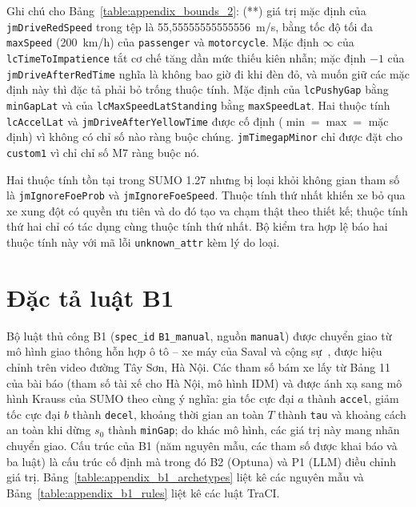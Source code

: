 \documentclass[../DoAn.tex]{subfiles}
\begin{document}
\begin{sloppypar}
Ghi chú cho Bảng~\ref{table:appendix_bounds_2}: (**) giá trị mặc định của \texttt{jmDriveRedSpeed} trong tệp là 55,55555555555556~m/s, bằng tốc độ tối đa \texttt{maxSpeed} (200~km/h) của \texttt{passenger} và \texttt{motorcycle}. Mặc định $\infty$ của \texttt{lcTimeToImpatience} tắt cơ chế tăng dần mức thiếu kiên nhẫn; mặc định $-1$ của \texttt{jmDriveAfterRedTime} nghĩa là không bao giờ đi khi đèn đỏ, và muốn giữ các mặc định này thì đặc tả phải bỏ trống thuộc tính. Mặc định của \texttt{lcPushyGap} bằng \texttt{minGapLat} và của \texttt{lcMaxSpeedLatStanding} bằng \texttt{maxSpeedLat}. Hai thuộc tính \texttt{lcAccelLat} và \texttt{jmDriveAfterYellowTime} được cố định ($\min = \max =$ mặc định) vì không có chỉ số nào ràng buộc chúng. \texttt{jmTimegapMinor} chỉ được đặt cho \texttt{custom1} vì chỉ chỉ số M7 ràng buộc nó.
\end{sloppypar}

Hai thuộc tính tồn tại trong SUMO 1.27 nhưng bị loại khỏi không gian tham số là \texttt{jmIgnoreFoeProb} và \texttt{jmIgnoreFoeSpeed}. Thuộc tính thứ nhất khiến xe bỏ qua xe xung đột có quyền ưu tiên và do đó tạo va chạm thật theo thiết kế; thuộc tính thứ hai chỉ có tác dụng cùng thuộc tính thứ nhất. Bộ kiểm tra hợp lệ báo hai thuộc tính này với mã lỗi \texttt{unknown\_attr} kèm lý do loại.

\section{Đặc tả luật B1}
\label{section:appendix_b1}

Bộ luật thủ công B1 (\texttt{spec\_id} \texttt{B1\_manual}, nguồn \texttt{manual}) được chuyển giao từ mô hình giao thông hỗn hợp ô tô -- xe máy của Saval và cộng sự~\cite{saval2023mixed}, được hiệu chỉnh trên video đường Tây Sơn, Hà Nội. Các tham số bám xe lấy từ Bảng 11 của bài báo (tham số tài xế cho Hà Nội, mô hình IDM) và được ánh xạ sang mô hình Krauss của SUMO theo cùng ý nghĩa: gia tốc cực đại $a$ thành \texttt{accel}, giảm tốc cực đại $b$ thành \texttt{decel}, khoảng thời gian an toàn $T$ thành \texttt{tau} và khoảng cách an toàn khi dừng $s_0$ thành \texttt{minGap}; do khác mô hình, các giá trị này mang nhãn chuyển giao. Cấu trúc của B1 (năm nguyên mẫu, các tham số được khai báo và ba luật) là cấu trúc cố định mà trong đó B2 (Optuna) và P1 (LLM) điều chỉnh giá trị. Bảng~\ref{table:appendix_b1_archetypes} liệt kê các nguyên mẫu và Bảng~\ref{table:appendix_b1_rules} liệt kê các luật TraCI.
\end{document}
